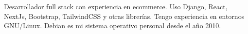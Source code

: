 


\begin{cvpubs}

  \cvpub
    {
      \begin{cvlist}
  \item {Desarrollador full stack con experiencia en ecommerce. Uso Django, React, NextJs, Bootstrap, TailwindCSS y otras librerías. Tengo experiencia en entornos GNU/Linux. Debian es mi sistema operativo personal desde el año 2010. }
      \end{cvlist}
    }\vspace{-15pt}
\end{cvpubs}
